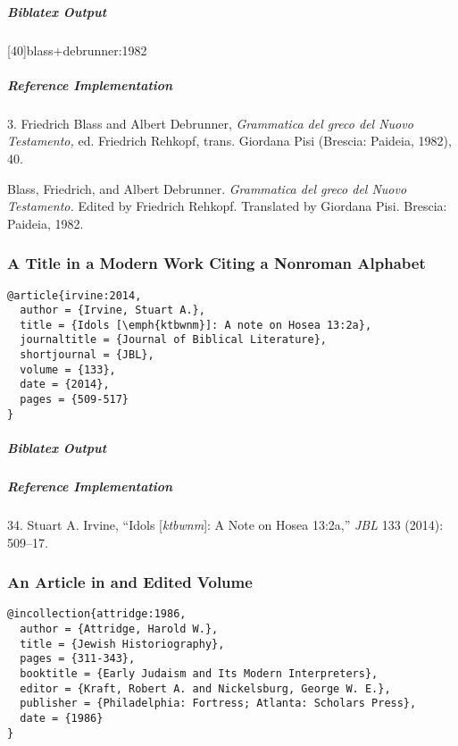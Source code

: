 \documentclass[a4paper]{article}
\newenvironment{biboutput}{%
  \subparagraph{Biblatex Output}
}{\color{black}}
\newenvironment{refimp}{%
  \subparagraph{Reference Implementation}
  \color{reference-colour}
  \rm
}{\par\color{black}}
\begin{document}
\begin{biboutput}
  [40]{blass+debrunner:1982}
\end{biboutput}

\begin{refimp}
  3. Friedrich Blass and Albert Debrunner, \emph{Grammatica del greco del
  Nuovo Testamento,} ed. Friedrich Rehkopf, trans. Giordana Pisi (Brescia:
  Paideia, 1982), 40.

  \hangindent\bibindent Blass, Friedrich, and Albert Debrunner.
  \emph{Grammatica del greco del Nuovo Testamento.} Edited by Friedrich
  Rehkopf. Translated by Giordana Pisi. Brescia: Paideia, 1982.
\end{refimp}

\subsubsection{A Title in a Modern Work Citing a Nonroman Alphabet}

\begin{lstlisting}
@article{irvine:2014,
  author = {Irvine, Stuart A.},
  title = {Idols [\emph{ktbwnm}]: A note on Hosea 13:2a},
  journaltitle = {Journal of Biblical Literature},
  shortjournal = {JBL},
  volume = {133},
  date = {2014},
  pages = {509-517}
}
\end{lstlisting}

\begin{biboutput}
\end{biboutput}

\begin{refimp}
  34. Stuart A. Irvine, “Idols [\emph{ktbwnm}]: A Note on Hosea 13:2a,”
  \emph{JBL} 133 (2014): 509–17.

\end{refimp}

\subsubsection{An Article in and Edited Volume}

\begin{lstlisting}
@incollection{attridge:1986,
  author = {Attridge, Harold W.},
  title = {Jewish Historiography},
  pages = {311-343},
  booktitle = {Early Judaism and Its Modern Interpreters},
  editor = {Kraft, Robert A. and Nickelsburg, George W. E.},
  publisher = {Philadelphia: Fortress; Atlanta: Scholars Press},
  date = {1986}
}
\end{lstlisting}  
\end{document}
